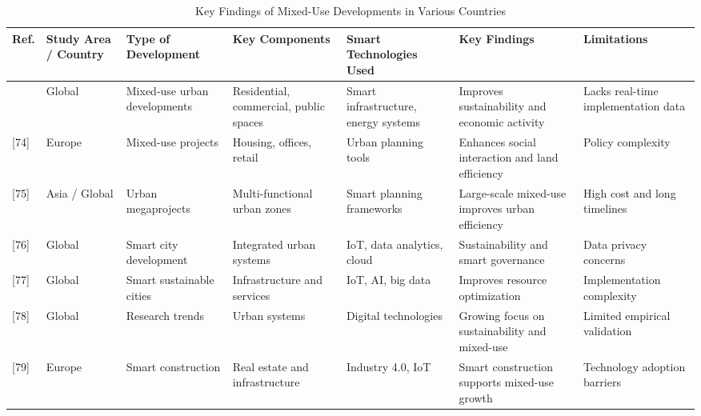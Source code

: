 \documentclass[pdflatex,sn-mathphys-num]{sn-jnl}%
\theoremstyle{thmstyleone}%
\theoremstyle{thmstyletwo}%
\theoremstyle{thmstylethree}%
\begin{document}
\begin{table}[!t]
\caption{Key Findings of Mixed-Use Developments in Various Countries}
\label{tab:mixed}
\centering
\scriptsize
\setlength{\tabcolsep}{3pt}
\renewcommand{\arraystretch}{1.15}

\begin{adjustbox}{width=\textwidth}
\begin{tabularx}{\textwidth}{|
>{\centering\arraybackslash}p{}|
>{\raggedright\arraybackslash}X|
>{\raggedright\arraybackslash}X|
>{\raggedright\arraybackslash}X|
>{\raggedright\arraybackslash}X|
>{\raggedright\arraybackslash}X|
>{\raggedright\arraybackslash}X|}
\hline

\textbf{Ref.} &
\textbf{Study Area / Country} &
\textbf{Type of Development} &
\textbf{Key Components} &
\textbf{Smart Technologies Used} &
\textbf{Key Findings} &
\textbf{Limitations} \\
\hline

[73] & Global & Mixed-use urban developments &
Residential, commercial, public spaces &
Smart infrastructure, energy systems &
Improves sustainability and economic activity &
Lacks real-time implementation data \\
\hline

[74] & Europe & Mixed-use projects &
Housing, offices, retail &
Urban planning tools &
Enhances social interaction and land efficiency &
Policy complexity \\
\hline

[75] & Asia / Global & Urban megaprojects &
Multi-functional urban zones &
Smart planning frameworks &
Large-scale mixed-use improves urban efficiency &
High cost and long timelines \\
\hline

[76] & Global & Smart city development &
Integrated urban systems &
IoT, data analytics, cloud &
Sustainability and smart governance &
Data privacy concerns \\
\hline

[77] & Global & Smart sustainable cities &
Infrastructure and services &
IoT, AI, big data &
Improves resource optimization &
Implementation complexity \\
\hline

[78] & Global & Research trends &
Urban systems &
Digital technologies &
Growing focus on sustainability and mixed-use &
Limited empirical validation \\
\hline

[79] & Europe & Smart construction &
Real estate and infrastructure &
Industry 4.0, IoT &
Smart construction supports mixed-use growth &
Technology adoption barriers \\
\hline


\end{tabularx}
\end{adjustbox}
\end{table}
\end{document}
